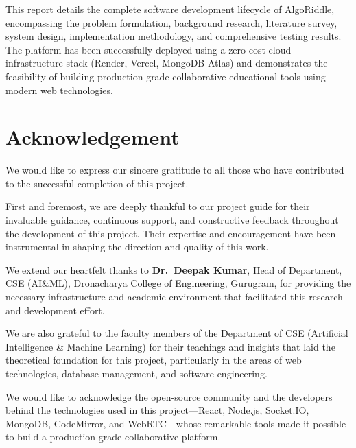 \documentclass[12pt,a4paper,oneside]{report}
\begin{document}
This report details the complete software development lifecycle of AlgoRiddle, encompassing the problem formulation, background research, literature survey, system design, implementation methodology, and comprehensive testing results. The platform has been successfully deployed using a zero-cost cloud infrastructure stack (Render, Vercel, MongoDB Atlas) and demonstrates the feasibility of building production-grade collaborative educational tools using modern web technologies.

\clearpage




\chapter*{Acknowledgement}

We would like to express our sincere gratitude to all those who have contributed to the successful completion of this project.

First and foremost, we are deeply thankful to our project guide for their invaluable guidance, continuous support, and constructive feedback throughout the development of this project. Their expertise and encouragement have been instrumental in shaping the direction and quality of this work.

We extend our heartfelt thanks to \textbf{Dr.~Deepak Kumar}, Head of Department, CSE (AI\&ML), Dronacharya College of Engineering, Gurugram, for providing the necessary infrastructure and academic environment that facilitated this research and development effort.

We are also grateful to the faculty members of the Department of CSE (Artificial Intelligence \& Machine Learning) for their teachings and insights that laid the theoretical foundation for this project, particularly in the areas of web technologies, database management, and software engineering.

We would like to acknowledge the open-source community and the developers behind the technologies used in this project---React, Node.js, Socket.IO, MongoDB, CodeMirror, and WebRTC---whose remarkable tools made it possible to build a production-grade collaborative platform.
\end{document}
